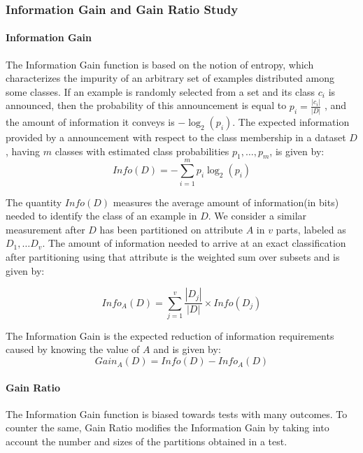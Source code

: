 \subsubsection{Information Gain and Gain Ratio Study}
\label{section:InformationGainAndGainRatioStudy}
\paragraph{Information Gain}
The Information Gain function is based on the notion of entropy, which characterizes the impurity of an arbitrary set of examples distributed among some classes. If an example is randomly selected from a set and its class $c_i$ is announced, then the probability of this announcement is equal to $p_i = \frac{|c_i|}{|D|}$ , and the amount of information it conveys is $-\log_2(p_i)$. The expected information provided by a announcement with respect to the class membership in a dataset $D$, having $m$ classes with estimated class probabilities $p_1,\ldots,p_m$, is given by:
\begin{equation}
Info(D) = -\sum_{i=1}^{m} p_i \log_2(p_i)
\end{equation}

The quantity $Info(D)$ measures the average amount of information(in bits) needed to identify the class of an example in $D$. We consider a similar measurement after $D$ has been partitioned on attribute $A$ in $v$ parts, labeled as $D_1,\ldots D_v$. The amount of information needed to arrive at an exact classification after partitioning using that attribute is the weighted sum over subsets and is given by:

\begin{equation}
Info_A(D) = \sum_{j=1}^v \frac{|D_j|}{|D|} \times Info(D_j)
\end{equation}

The Information Gain is the expected reduction of information requirements caused by knowing the value of $A$ and is given by:
\begin{equation}
Gain_A(D) = Info(D) - Info_A(D)
\end{equation}

\paragraph{Gain Ratio}
The Information Gain function is biased towards tests with many outcomes. To counter the same, Gain Ratio modifies the Information Gain by taking into account the number and sizes of the partitions obtained in a test.

